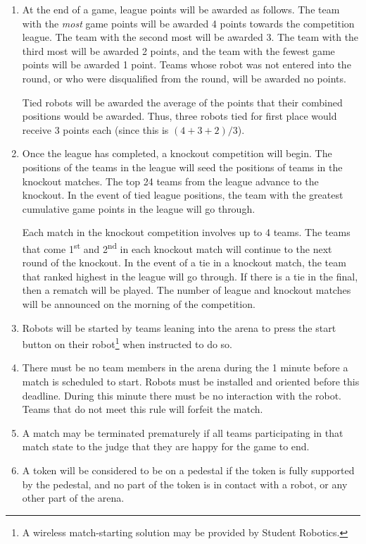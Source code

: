 \begin{enumerate}
\item At the end of a game, league points will be awarded as follows.
      The team with the \emph{most} game points will be awarded 4 points towards the competition league.
      The team with the second most will be awarded 3.
      The team with the third most will be awarded 2 points, and the team with the fewest game points will be awarded 1 point.
      Teams whose robot was not entered into the round, or who were disqualified from the round, will be awarded no points.

      Tied robots will be awarded the average of the points that their combined positions would be awarded.
      Thus, three robots tied for first place would receive 3 points each (since this is $(4+3+2)/3$).

\item Once the league has completed, a knockout competition will begin.
      The positions of the teams in the league will seed the positions of teams in the knockout matches.
      The top 24 teams from the league advance to the knockout.
      In the event of tied league positions, the team with the greatest cumulative game points in the league will go through.

      Each match in the knockout competition involves up to 4 teams.
      The teams that come 1\textsuperscript{st} and 2\textsuperscript{nd} in each knockout match will continue to the next round of the knockout.
      In the event of a tie in a knockout match, the team that ranked highest in the league will go through.
      If there is a tie in the final, then a rematch will be played.
      The number of league and knockout matches will be announced on the morning of the competition.

\item Robots will be started by teams leaning into the arena to press the start button on their robot\footnote{A wireless match-starting solution may be provided by Student Robotics.} when instructed to do so.

\item There must be no team members in the arena during the 1 minute before a match is scheduled to start.
      Robots must be installed and oriented before this deadline.
      During this minute there must be no interaction with the robot.
      Teams that do not meet this rule will forfeit the match.

\item A match may be terminated prematurely if all teams participating in that match state to the judge that they are happy for the game to end.

\item A token will be considered to be on a pedestal if the token is fully supported by the pedestal, and no part of the token is in contact with a robot, or any other part of the arena.

\end{enumerate}
